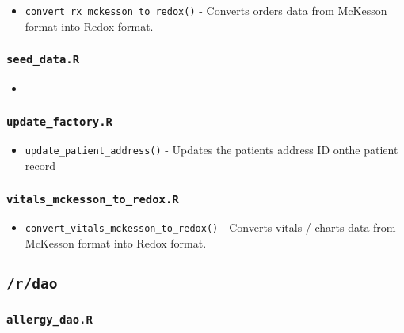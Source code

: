 \documentclass[
]{book}
\providecommand{\tightlist}{%
  \setlength{\itemsep}{0pt}\setlength{\parskip}{0pt}}
\begin{document}
\begin{itemize}
\tightlist
\item
  \texttt{convert\_rx\_mckesson\_to\_redox()} - Converts orders data from McKesson format into Redox format.
\end{itemize}

\hypertarget{seed_data.r}{%
\subsubsection{\texorpdfstring{\texttt{seed\_data.R}}{seed\_data.R}}\label{seed_data.r}}

\begin{itemize}
\item
\end{itemize}

\hypertarget{update_factory.r}{%
\subsubsection{\texorpdfstring{\texttt{update\_factory.R}}{update\_factory.R}}\label{update_factory.r}}

\begin{itemize}
\tightlist
\item
  \texttt{update\_patient\_address()} - Updates the patients address ID onthe patient record
\end{itemize}

\hypertarget{vitals_mckesson_to_redox.r}{%
\subsubsection{\texorpdfstring{\texttt{vitals\_mckesson\_to\_redox.R}}{vitals\_mckesson\_to\_redox.R}}\label{vitals_mckesson_to_redox.r}}

\begin{itemize}
\tightlist
\item
  \texttt{convert\_vitals\_mckesson\_to\_redox()} - Converts vitals / charts data from McKesson format into Redox format.
\end{itemize}

\hypertarget{rdao-2}{%
\subsection{\texorpdfstring{\texttt{/r/dao}}{/r/dao}}\label{rdao-2}}

\hypertarget{allergy_dao.r}{%
\subsubsection{\texorpdfstring{\texttt{allergy\_dao.R}}{allergy\_dao.R}}\label{allergy_dao.r}}
\end{document}
